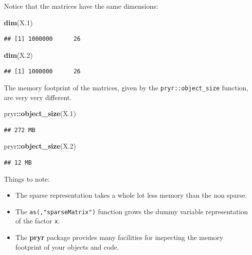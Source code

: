 \documentclass[]{book}
\newenvironment{Shaded}{\begin{snugshade}}{\end{snugshade}}
\newcommand{\FloatTok}[1]{\textcolor[rgb]{0.00,0.00,0.81}{#1}}
\newcommand{\KeywordTok}[1]{\textcolor[rgb]{0.13,0.29,0.53}{\textbf{#1}}}
\newcommand{\NormalTok}[1]{#1}
\newcommand{\OperatorTok}[1]{\textcolor[rgb]{0.81,0.36,0.00}{\textbf{#1}}}
\providecommand{\tightlist}{%
  \setlength{\itemsep}{0pt}\setlength{\parskip}{0pt}}
\theoremstyle{definition}
\theoremstyle{definition}
\theoremstyle{definition}
\theoremstyle{remark}
\begin{document}
Notice that the matrices have the same dimensions:

\begin{Shaded}
\begin{Highlighting}[]
\KeywordTok{dim}\NormalTok{(X}\FloatTok{.1}\NormalTok{)}
\end{Highlighting}
\end{Shaded}

\begin{verbatim}
## [1] 1000000      26
\end{verbatim}

\begin{Shaded}
\begin{Highlighting}[]
\KeywordTok{dim}\NormalTok{(X}\FloatTok{.2}\NormalTok{)}
\end{Highlighting}
\end{Shaded}

\begin{verbatim}
## [1] 1000000      26
\end{verbatim}

The memory footprint of the matrices, given by the \texttt{pryr::object\_size} function, are very very different.

\begin{Shaded}
\begin{Highlighting}[]
\NormalTok{pryr}\OperatorTok{::}\KeywordTok{object_size}\NormalTok{(X}\FloatTok{.1}\NormalTok{)}
\end{Highlighting}
\end{Shaded}

\begin{verbatim}
## 272 MB
\end{verbatim}

\begin{Shaded}
\begin{Highlighting}[]
\NormalTok{pryr}\OperatorTok{::}\KeywordTok{object_size}\NormalTok{(X}\FloatTok{.2}\NormalTok{)}
\end{Highlighting}
\end{Shaded}

\begin{verbatim}
## 12 MB
\end{verbatim}

Things to note:

\begin{itemize}
\tightlist
\item
  The sparse representation takes a whole lot less memory than the non sparse.
\item
  The \texttt{as(,"sparseMatrix")} function grows the dummy variable representation of the factor \texttt{x}.
\item
  The \textbf{pryr} package provides many facilities for inspecting the memory footprint of your objects and code.
\end{itemize}
\end{document}
